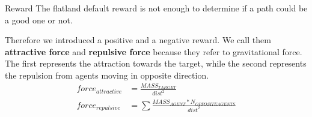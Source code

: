 \documentclass[10pt, xcolor={dvipsnames}]{beamer}
\begin{document}
\begin{frame}{Reward}
    The flatland default reward is not enough to determine if a path could be a good one or not.
    
    Therefore we introduced a positive and a negative reward. We call them \textbf{attractive force} and \textbf{repulsive force} because they refer to gravitational force. The first represents the attraction towards the target, while the second represents the repulsion from agents moving in opposite direction.
    \begin{align*}
        force_{attractive} &= \frac{MASS_{TARGET}}{dist^2} \\
        force_{repulsive} &= \sum \frac{MASS_{AGENT} * N_{OPPOSITE AGENTS}}{dist^2}
    \end{align*}
\end{frame}


\end{document}
